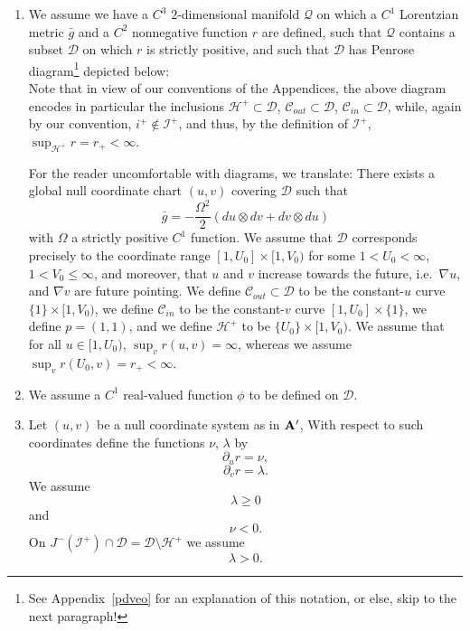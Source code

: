 \documentclass{article}
\begin{document}
\begin{enumerate}
\item[${\bf A}'$.]
We assume
we have a $C^3$ $2$-dimensional manifold $\mathcal{Q}$ on which a
$C^1$ Lorentzian metric $\bar{g}$ and
a $C^2$ nonnegative function $r$ are defined, such 
that $\mathcal{Q}$
contains a subset $\mathcal{D}$ on which $r$ is strictly positive,
and such that $\mathcal{D}$ has Penrose 
diagram\footnote{See Appendix~\ref{pdveo} 
for an explanation of this notation, or else, skip to the
next paragraph!} 
depicted below:
\[

\]
Note
that in view of our conventions of the Appendices,
the above diagram encodes in particular the
inclusions $\mathcal{H}^+\subset\mathcal{D}$, 
$\mathcal{C}_{out}\subset\mathcal{D}$, $\mathcal{C}_{in}\subset\mathcal{D}$,
while, 
again by our convention,
$i^+\not\in \mathcal{I}^+$, and thus, by the definition of $\mathcal{I}^+$,
$\sup_{\mathcal{H}^+}r=r_+<\infty$.

For the reader uncomfortable with diagrams, we translate:
There exists 
a global null coordinate chart $(u,v)$ covering $\mathcal{D}$
such that
\[
\bar{g}=-\frac{\Omega^2}2(du\otimes dv+dv\otimes du)
\]
with $\Omega$ a strictly positive $C^1$ function.
We assume that $\mathcal{D}$ corresponds precisely to the
coordinate range $[1,U_0]\times[1,V_0)$ for some $1<U_0<\infty$,
$1<V_0\le\infty$, and moreover, that $u$ and $v$ increase towards the future,
i.e.~$\nabla u$, and $\nabla v$ are future pointing.
We define  
$\mathcal{C}_{out}\subset\mathcal{D}$ to be the constant-$u$
curve $\{1\}\times[1,V_0)$, we define
$\mathcal{C}_{in}$ to be the constant-$v$ curve
$[1,U_0]\times\{1\}$, we define $p=(1,1)$,
and we define $\mathcal{H}^+$ to be $\{U_0\}\times [1,V_0)$. 
We assume that for all $u\in[1,U_0)$, $\sup_{v} r(u,v)=\infty$,
whereas we assume $\sup_{v}r(U_0,v)=r_+<\infty$.

\item[${\bf B}'$.] We assume a $C^1$ real-valued
function $\phi$ to be defined on $\mathcal{D}$.

\item[${\bf \Gamma}'$.]
Let $(u,v)$ be a null coordinate system as in
${\bf A}'$,
With respect to such coordinates
define the functions $\nu$, $\lambda$ by
\begin{equation}
\label{ruqu}
\partial_ur=\nu,
\end{equation}
\begin{equation}
\label{rvqu}
\partial_vr=\lambda.
\end{equation}
We assume
\begin{equation}
\label{lamov}
\lambda\ge0
\end{equation}
and 
\begin{equation}
\label{vumov}
\nu<0. 
\end{equation}
On $J^-(\mathcal{I}^+)\cap\mathcal{D}=\mathcal{D}\setminus\mathcal{H}^+$ we assume
\begin{equation}
\label{lamov2}
\lambda>0.
\end{equation}


\end{enumerate}
\end{document}
